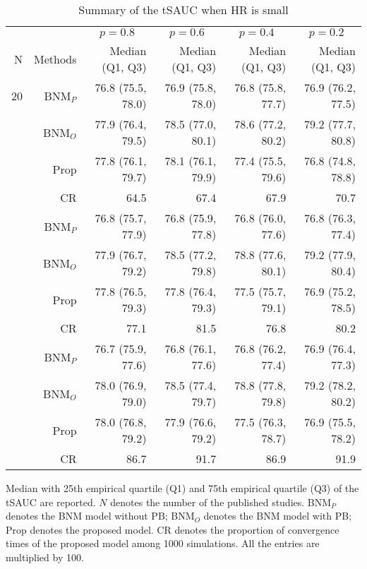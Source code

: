 \begin{table}[!htb]

\caption{\label{tab:sauc.med.1}Summary of the tSAUC when HR is small}
\centering
\begin{threeparttable}
\begin{tabular}[t]{rrrrrr}
\toprule
\multicolumn{1}{c}{} & \multicolumn{1}{c}{} & \multicolumn{1}{c}{$p = 0.8$} & \multicolumn{1}{c}{$p = 0.6$} & \multicolumn{1}{c}{$p = 0.4$} & \multicolumn{1}{c}{$p = 0.2$} \\
\cmidrule(l{3pt}r{3pt}){3-3} \cmidrule(l{3pt}r{3pt}){4-4} \cmidrule(l{3pt}r{3pt}){5-5} \cmidrule(l{3pt}r{3pt}){6-6}
N & Methods & Median (Q1, Q3) & Median (Q1, Q3) & Median (Q1, Q3) & Median (Q1, Q3)\\
\midrule
20 & BNM$_P$ & 76.8 (75.5, 78.0) & 76.9 (75.8, 78.0) & 76.8 (75.8, 77.7) & 76.9 (76.2, 77.5)\\
 & BNM$_O$ & 77.9 (76.4, 79.5) & 78.5 (77.0, 80.1) & 78.6 (77.2, 80.2) & 79.2 (77.7, 80.8)\\
 & Prop & 77.8 (76.1, 79.7) & 78.1 (76.1, 79.9) & 77.4 (75.5, 79.6) & 76.8 (74.8, 78.8)\\
 & CR & 64.5 & 67.4 & 67.9 & 70.7\\
\addlinespace
30 & BNM$_P$ & 76.8 (75.7, 77.9) & 76.8 (75.9, 77.8) & 76.8 (76.0, 77.6) & 76.8 (76.3, 77.4)\\
 & BNM$_O$ & 77.9 (76.7, 79.2) & 78.5 (77.2, 79.8) & 78.8 (77.6, 80.1) & 79.2 (77.9, 80.4)\\
 & Prop & 77.8 (76.5, 79.3) & 77.8 (76.4, 79.3) & 77.5 (75.7, 79.1) & 76.9 (75.2, 78.5)\\
 & CR & 77.1 & 81.5 & 76.8 & 80.2\\
\addlinespace
50 & BNM$_P$ & 76.7 (75.9, 77.6) & 76.8 (76.1, 77.6) & 76.8 (76.2, 77.4) & 76.9 (76.4, 77.3)\\
 & BNM$_O$ & 78.0 (76.9, 79.0) & 78.5 (77.4, 79.7) & 78.8 (77.8, 79.8) & 79.2 (78.2, 80.2)\\
 & Prop & 78.0 (76.8, 79.2) & 77.9 (76.6, 79.2) & 77.5 (76.3, 78.7) & 76.9 (75.5, 78.2)\\
 & CR & 86.7 & 91.7 & 86.9 & 91.9\\
\bottomrule
\end{tabular}
\begin{tablenotes}
\item 
Median with 25th empirical quartile (Q1) and 75th empirical quartile (Q3) of the tSAUC are reported. 
$N$ denotes the number of the published studies. 
BNM$_P$ denotes the BNM model without PB; 
BNM$_O$ denotes the BNM model with PB;
Prop denotes the proposed model.
CR denotes the proportion of convergence times of the proposed model among 1000 simulations.
All the entries are multiplied by 100.
\end{tablenotes}
\end{threeparttable}
\end{table}
